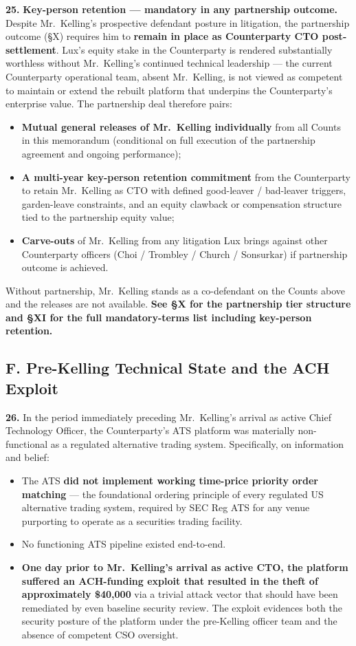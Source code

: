 \documentclass[11pt,letterpaper]{article}
\begin{document}
\textbf{25.} \textbf{Key-person retention --- mandatory in any
partnership outcome.} Despite Mr.\ Kelling's prospective defendant
posture in litigation, the partnership outcome (\S X) requires
him to \textbf{remain in place as Counterparty CTO post-settlement}.
Lux's equity stake in the Counterparty is rendered substantially
worthless without Mr.\ Kelling's continued technical leadership ---
the current Counterparty operational team, absent Mr.\ Kelling, is
not viewed as competent to maintain or extend the rebuilt platform
that underpins the Counterparty's enterprise value. The partnership
deal therefore pairs:
\begin{itemize}[leftmargin=2em,itemsep=0.1em]
\item \textbf{Mutual general releases of Mr.\ Kelling individually}
from all Counts in this memorandum (conditional on full execution
of the partnership agreement and ongoing performance);
\item \textbf{A multi-year key-person retention commitment} from the
Counterparty to retain Mr.\ Kelling as CTO with defined good-leaver
/ bad-leaver triggers, garden-leave constraints, and an equity
clawback or compensation structure tied to the partnership equity
value;
\item \textbf{Carve-outs} of Mr.\ Kelling from any litigation Lux
brings against other Counterparty officers (Choi / Trombley /
Church / Sonsurkar) if partnership outcome is achieved.
\end{itemize}
Without partnership, Mr.\ Kelling stands as a co-defendant on the
Counts above and the releases are not available. \textbf{See \S X for
the partnership tier structure and \S XI for the full mandatory-terms
list including key-person retention.}

\subsection*{F. Pre-Kelling Technical State and the ACH Exploit}

\textbf{26.} In the period immediately preceding Mr.\ Kelling's
arrival as active Chief Technology Officer, the Counterparty's ATS
platform was materially non-functional as a regulated alternative
trading system. Specifically, on information and belief:

\begin{itemize}[leftmargin=2em,itemsep=0.1em]
\item The ATS \textbf{did not implement working time-price priority
order matching} --- the foundational ordering principle of every
regulated US alternative trading system, required by SEC Reg ATS
for any venue purporting to operate as a securities trading facility.
\item No functioning ATS pipeline existed end-to-end.
\item \textbf{One day prior to Mr.\ Kelling's arrival as active CTO,
the platform suffered an ACH-funding exploit that resulted in the
theft of approximately \$40,000} via a trivial attack vector that
should have been remediated by even baseline security review. The
exploit evidences both the security posture of the platform under
the pre-Kelling officer team and the absence of competent CSO
oversight.
\end{itemize}
\end{document}
